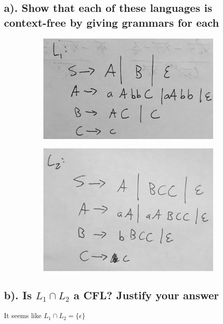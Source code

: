 \documentclass[20pt]{article} %
\begin{document}
\subsection{a). Show that each of these languages is context-free by giving grammars for each}
\begin{figure}[!htbp]
  	\centering
   	\begin{subfigure}[p]{0.4\linewidth}
    	\includegraphics[width=\linewidth]{./figures/h8-5.jpg}
   	\end{subfigure}
  	\centering
   	\begin{subfigure}[p]{0.4\linewidth}
    	\includegraphics[width=\linewidth]{./figures/h8-6.jpg}
   	\end{subfigure}
\end{figure} 
\subsection{b). Is $L_1 \cap L_2$ a CFL? Justify your answer}
It seems like $L_1 \cap L_2 = \{ \epsilon \}$
\end{document}
